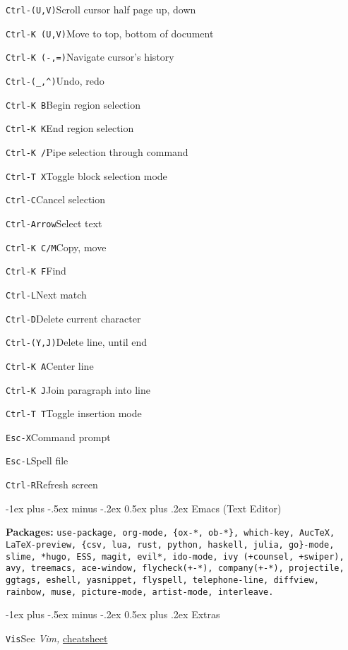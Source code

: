 \documentclass[12pt,landscape]{article}
\makeatletter
\renewcommand{\section}{\@startsection{section}{1}{0mm}%
                                {-1ex plus -.5ex minus -.2ex}%
                                {0.5ex plus .2ex}%
                                {\normalfont\large\bfseries}}
\def\cm#1#2{{\tt#1}\dotfill#2\par}
\makeatother
\begin{document}
\begin{multicols}{3}
\cm{Ctrl-(U,V)}{Scroll cursor half page up, down}

\cm{Ctrl-K (U,V)}{Move to top, bottom of document}

\cm{Ctrl-K (-,=)}{Navigate cursor's history}

\cm{Ctrl-(\_,\textasciicircum)}{Undo, redo}

\cm{Ctrl-K B}{Begin region selection}

\cm{Ctrl-K K}{End region selection}

\cm{Ctrl-K /}{Pipe selection through command}

\cm{Ctrl-T X}{Toggle block selection mode}

\cm{Ctrl-C}{Cancel selection}

\cm{Ctrl-Arrow}{Select text}

\cm{Ctrl-K C/M}{Copy, move}

\cm{Ctrl-K F}{Find}

\cm{Ctrl-L}{Next match}

\cm{Ctrl-D}{Delete current character}

\cm{Ctrl-(Y,J)}{Delete line, until end}

\cm{Ctrl-K A}{Center line}

\cm{Ctrl-K J}{Join paragraph into line}

\cm{Ctrl-T T}{Toggle insertion mode}

\cm{Esc-X}{Command prompt}

\cm{Esc-L}{Spell file}

\cm{Ctrl-R}{Refresh screen}

\section{Emacs (Text Editor)}

\textbf{Packages:} \texttt{use-package, org-mode, \{ox-*, ob-*\}, which-key, AucTeX, LaTeX-preview, \{csv, lua, rust, python, haskell, julia, go\}-mode, slime, *hugo, ESS, magit, evil*, ido-mode, ivy (+counsel, +swiper), avy, treemacs, ace-window, flycheck(+-*), company(+-*), projectile, ggtags, eshell, yasnippet, flyspell, telephone-line, diffview, rainbow, muse, picture-mode, artist-mode, interleave.}

\section{Extras}

\cm{Vis}{See \textit{Vim,} \href{http://tnerual.eriogerg.free.fr/vimqrc.pdf}{cheatsheet}}


\end{multicols}
\end{document}
